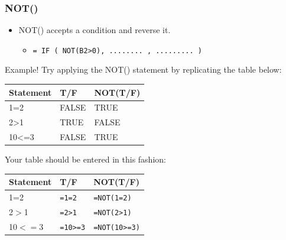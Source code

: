 \documentclass[12pt]{beamer}
\begin{document}
\begin{frame}
	\frametitle{NOT()}
	\begin{itemize}
		\item NOT() accepts a condition and reverse it. 
		\begin{itemize}
			\item \texttt{= IF ( NOT(B2>0), ........ , ......... )}
		\end{itemize}
	\end{itemize}
Example! Try applying the NOT() statement by replicating the table below:
\begin{center}
	\begin{tabular}{l | l | l }
	Statement & T/F  & NOT(T/F)\\ 
	\hline
	1=2 & FALSE & TRUE \\
	2>1  & TRUE & FALSE \\ 
	10<=3 & FALSE & TRUE 
	\end{tabular}
\end{center}
Your table should be entered in this fashion:
\begin{center}
	\begin{tabular}{l |l | l}
		Statement & T/F  & NOT(T/F)\\ 
		\hline
		1=2 & \texttt{=1=2} & \texttt{=NOT(1=2)} \\
		2$>$1  & \texttt{=2>1}& \texttt{=NOT(2>1)}\\ 
		10$<=$3 & \texttt{=10>=3} & \texttt{=NOT(10>=3)}
	\end{tabular}
\end{center}
\end{frame}
\end{document}
